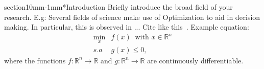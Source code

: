 \documentclass[a0,portrait]{a0poster}
\makeatletter
\renewcommand{\LARGE}{\fontsize{50}{70}\selectfont\bfseries} %
\renewcommand{\section}{\@startsection%
  {section}{1}{0mm}{-\baselineskip}{1mm}{\LARGE\color{myred}\bfseries}}
\makeatother
\begin{document}
\begin{multicols}{2}
\section*{\textcolor{myblue}{Introduction}}
\textcolor{myblue}{
Briefly introduce the broad field of your research. E.g: Several fields of science make use of Optimization to aid in decision making. In particular, this is observed in ...
Cite like this~\cite{Reference4, Reference6}.
Example equation:
\begin{equation}\label{problema_geral}
\begin{array}{cl}
\displaystyle\min_{x}&f(x)\ \mbox{ with } x \in \mathbb{R}^n  \\
s.a & g(x)\leq 0,
\end{array}
\end{equation}
where the functions $f:\mathbb{R}^{n}\rightarrow\mathbb{R}$ and $g:\mathbb{R}^{n}\rightarrow\mathbb{R}$ are continuously differentiable.}

\end{multicols}
\end{document}
